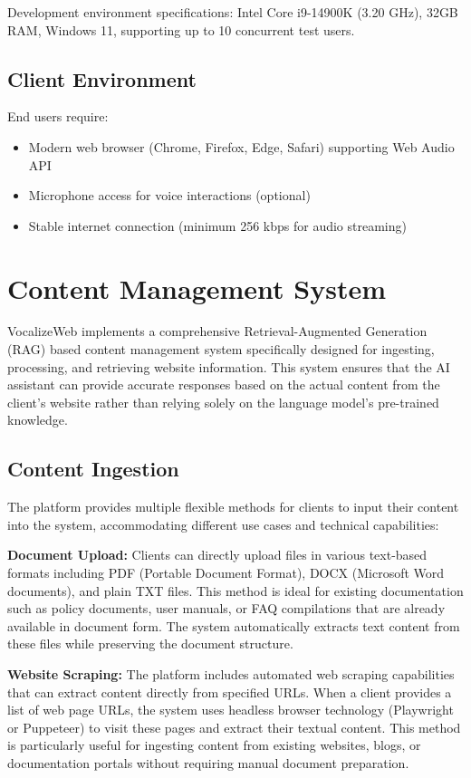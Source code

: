 Development environment specifications: Intel Core i9-14900K (3.20 GHz), 32GB RAM, Windows 11, supporting up to 10 concurrent test users.

\subsection{Client Environment}

End users require:
\begin{itemize}[leftmargin=*]
    \item Modern web browser (Chrome, Firefox, Edge, Safari) supporting Web Audio API
    \item Microphone access for voice interactions (optional)
    \item Stable internet connection (minimum 256 kbps for audio streaming)
\end{itemize}

\section{Content Management System}

VocalizeWeb implements a comprehensive Retrieval-Augmented Generation (RAG) based content management system specifically designed for ingesting, processing, and retrieving website information. This system ensures that the AI assistant can provide accurate responses based on the actual content from the client's website rather than relying solely on the language model's pre-trained knowledge.

\subsection{Content Ingestion}

The platform provides multiple flexible methods for clients to input their content into the system, accommodating different use cases and technical capabilities:

\textbf{Document Upload:} Clients can directly upload files in various text-based formats including PDF (Portable Document Format), DOCX (Microsoft Word documents), and plain TXT files. This method is ideal for existing documentation such as policy documents, user manuals, or FAQ compilations that are already available in document form. The system automatically extracts text content from these files while preserving the document structure.

\textbf{Website Scraping:} The platform includes automated web scraping capabilities that can extract content directly from specified URLs. When a client provides a list of web page URLs, the system uses headless browser technology (Playwright or Puppeteer) to visit these pages and extract their textual content. This method is particularly useful for ingesting content from existing websites, blogs, or documentation portals without requiring manual document preparation.

